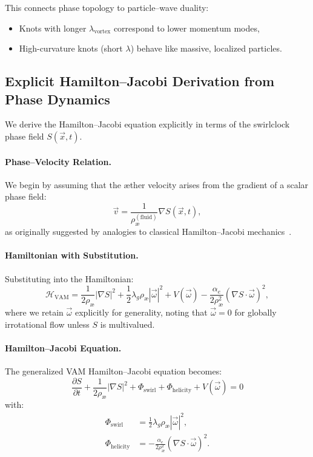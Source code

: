 \documentclass[preprint]{revtex4-2}
\begin{document}
This connects phase topology to particle–wave duality:
\begin{itemize}
\item Knots with longer \( \lambda_\text{vortex} \) correspond to lower momentum modes,
\item High-curvature knots (short \( \lambda \)) behave like massive, localized particles.
\end{itemize}

\subsection*{Explicit Hamilton--Jacobi Derivation from Phase Dynamics}

We derive the Hamilton--Jacobi equation explicitly in terms of the swirlclock phase field \( S(\vec{x}, t) \).

\paragraph{Phase--Velocity Relation.}
We begin by assuming that the \ae ther velocity arises from the gradient of a scalar phase field:
\begin{equation}
\vec{v} = \frac{1}{\rho_\text{\ae}^{(\text{fluid})}} \nabla S(\vec{x}, t),
\end{equation}
as originally suggested by analogies to classical Hamilton--Jacobi mechanics~\cite{arnold1998topological, moffatt1969degree}.

\paragraph{Hamiltonian with Substitution.}
Substituting into the Hamiltonian:
\begin{equation}
\mathcal{H}_\text{VAM} = \frac{1}{2 \rho_\text{\ae}} |\nabla S|^2 + \frac{1}{2} \lambda_g \rho_\text{\ae} |\vec{\omega}|^2 + V(\vec{\omega}) - \frac{\alpha_e}{2 \rho_\text{\ae}^2} (\nabla S \cdot \vec{\omega})^2,
\end{equation}
where we retain \( \vec{\omega} \) explicitly for generality, noting that \( \vec{\omega} = 0 \) for globally irrotational flow unless \( S \) is multivalued.

\paragraph{Hamilton--Jacobi Equation.}
The generalized VAM Hamilton--Jacobi equation becomes:
\begin{equation}
\boxed{
\frac{\partial S}{\partial t} + \frac{1}{2 \rho_\text{\ae}} |\nabla S|^2 + \Phi_\text{swirl} + \Phi_\text{helicity} + V(\vec{\omega}) = 0
}
\end{equation}
with:
\begin{align*}
\Phi_\text{swirl} &= \frac{1}{2} \lambda_g \rho_\text{\ae} |\vec{\omega}|^2, \\
\Phi_\text{helicity} &= -\frac{\alpha_e}{2 \rho_\text{\ae}^2} (\nabla S \cdot \vec{\omega})^2.
\end{align*}
\end{document}

